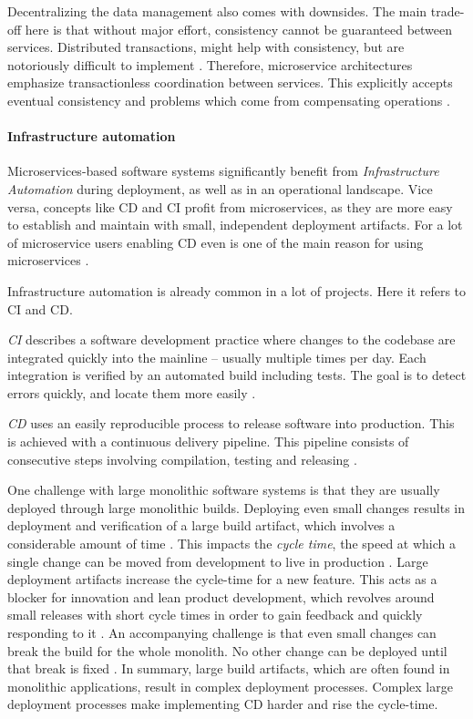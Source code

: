 Decentralizing the data management also comes with downsides.
The main trade-off here is that without major effort, consistency cannot be guaranteed between services.
Distributed transactions, might help with consistency, but are notoriously difficult to implement \cite{FowlerDecentralizedData2014}.
Therefore, microservice architectures emphasize transactionless coordination between services.
This explicitly accepts eventual consistency and problems which come from compensating operations \cite{FowlerDecentralizedData2014}.

\paragraph{Infrastructure automation}
\label{bac:infraAutomation}
Microservices-based software systems significantly benefit from \textit{Infrastructure Automation} during deployment, as well as in an operational landscape.
Vice versa, concepts like \ac{CD} and \ac{CI} profit from microservices, as they are more easy to establish and maintain with small, independent deployment artifacts.
For a lot of microservice users enabling \ac{CD} even is one of the main reason for using microservices 
\citep[p. 5]{Wolff2016}.

Infrastructure automation is already common in a lot of projects.
Here it refers to \acl{CI} and \acl{CD}.

\textit{\acl{CI}} describes a software development practice where changes to the codebase are integrated quickly into the mainline -- usually multiple times per day.
Each integration is verified by an automated build including tests.
The goal is to detect errors quickly, and locate them more easily \cite{FowlerCI2011} \citep[p. 104]{Newman2015}.

\textit{\acl{CD}} uses an easily reproducible process to release software into production.
This is achieved with a continuous delivery pipeline.
This pipeline consists of consecutive steps involving compilation, testing and releasing \citep[p. 63]{Wolff2016}.

One challenge with large monolithic software systems is that they are usually deployed through large monolithic builds. 
Deploying even small changes results in deployment and verification of a large build artifact, which involves a considerable amount of time \citep[p. 105]{Newman2015}.
This impacts the \textit{cycle time}, the speed at which a single change can be moved from development to live in production \citep[p. 105]{Newman2015}.
Large deployment artifacts increase the cycle-time for a new feature.
This acts as a blocker for innovation and lean product development, which revolves around small releases with short cycle times in order to gain feedback and quickly responding to it \citep[p. 30-32]{Poppendieck2006}. 
An accompanying challenge is that even small changes can break the build for the whole monolith. 
No other change can be deployed until that break is fixed \citep[p. 105]{Newman2015}.
In summary, large build artifacts, which are often found in monolithic applications, result in complex deployment processes.
Complex large deployment processes make implementing \ac{CD} harder and rise the cycle-time.

